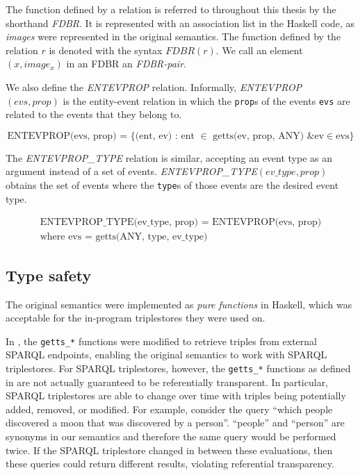 \documentclass[../main.tex]{subfiles}
\begin{document}
The function defined by a relation is referred to throughout this thesis by the shorthand {\em FDBR}.  It is represented with an association list in the Haskell code,
as {\em images} were represented in the original semantics.  The function defined by the relation $r$ is denoted with the syntax $FDBR(r)$.
We call an element $(x, image_x)$ in an FDBR an {\em FDBR-pair}.

We also define the {\em ENTEVPROP} relation.  Informally, {\em ENTEVPROP}$(evs, prop)$ is the entity-event relation in which the \texttt{prop}s of the events \texttt{evs} are related to the events that they belong to.

\begin{definition}
	\[\text{ENTEVPROP(evs, prop) = }\{\text{(ent, ev) : ent } \in \text{ getts(ev, prop, ANY) \& ev} \in \text{evs} \}\]
\end{definition}

The {\em ENTEVPROP\_TYPE} relation is similar, accepting an event type as an argument instead of a set of events.
{\em ENTEVPROP\_TYPE}$(ev\_type, prop)$ obtains the set of events where the \texttt{type}s of those events are the desired event type.


\begin{definition}
	\begin{equation}
	\begin{split}
	\text{ENTEVPROP\_TYPE(ev\_type, prop) = ENTEVPROP(evs, prop)} \\ \text{where evs = getts(ANY, type, ev\_type)}
	\end{split}
	\end{equation}
\end{definition}

\subsection{Type safety}

The original semantics were implemented as {\em pure functions} in Haskell, which was acceptable for the in-program triplestores they were used on.

In \cite{agboola2015extensible}, the \texttt{getts\_*} functions were modified to retrieve triples from external SPARQL endpoints, enabling the original
semantics to work with SPARQL triplestores.  For SPARQL triplestores, however, the \texttt{getts\_*} functions as defined in \cite{agboola2015extensible} are not actually guaranteed to be referentially transparent. In particular, SPARQL triplestores are able to change over time with triples being potentially added, removed, or modified.
For example, consider the query ``which people discovered a moon that was discovered by a person''.
``people'' and ``person'' are synonyms in our semantics and therefore the same query would be performed twice.  If the SPARQL triplestore changed in between these evaluations,
then these queries could return different results, violating referential transparency.
\end{document}
